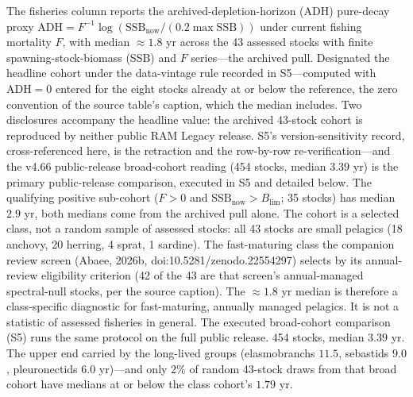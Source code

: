 \documentclass[11pt]{article}
\begin{document}
The fisheries column reports the archived-depletion-horizon (ADH) pure-decay proxy \(\mathrm{ADH} = F^{-1}\log(\mathrm{SSB}_{\mathrm{now}}/(0.2\max\mathrm{SSB}))\) under current fishing mortality \(F\), with median \(\approx 1.8\) yr across the 43 assessed stocks with finite spawning-stock-biomass (SSB) and \(F\) series---the archived pull. Designated the headline cohort under the data-vintage rule recorded in S5---computed with \(\mathrm{ADH} = 0\) entered for the eight stocks already at or below the reference, the zero convention of the source table's caption, which the median includes. Two disclosures accompany the headline value: the archived 43-stock cohort is reproduced by neither public RAM Legacy release. S5's version-sensitivity record, cross-referenced here, is the retraction and the row-by-row re-verification---and the v4.66 public-release broad-cohort reading (454 stocks, median \(3.39\) yr) is the primary public-release comparison, executed in S5 and detailed below. The qualifying positive sub-cohort (\(F > 0\) and \(\mathrm{SSB}_{\mathrm{now}} > B_{\lim}\); 35 stocks) has median \(2.9\) yr, both medians come from the archived pull alone. The cohort is a selected class, not a random sample of assessed stocks: all 43 stocks are small pelagics (18 anchovy, 20 herring, 4 sprat, 1 sardine). The fast-maturing class the companion review screen (Abaee, 2026b, doi:10.5281/\allowbreak{}zenodo.22554297) selects by its annual-review eligibility criterion (42 of the 43 are that screen's annual-managed spectral-null stocks, per the source caption). The \(\approx 1.8\) yr median is therefore a class-specific diagnostic for fast-maturing, annually managed pelagics. It is not a statistic of assessed fisheries in general. The executed broad-cohort comparison (S5) runs the same protocol on the full public release. 454 stocks, median \(3.39\) yr. The upper end carried by the long-lived groups (elasmobranchs \(11.5\), sebastids \(9.0\), pleuronectids \(6.0\) yr)---and only \(2\%\) of random 43-stock draws from that broad cohort have medians at or below the class cohort's \(1.79\) yr.
\end{document}
